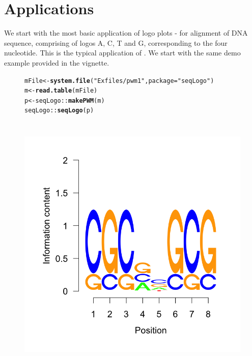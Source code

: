 \documentclass[12pt]{article}\usepackage[]{graphicx}\usepackage[usenames,dvipsnames]{color}
\makeatletter
\newcommand{\hlstr}[1]{\textcolor[rgb]{0.192,0.494,0.8}{#1}}%
\newcommand{\hlopt}[1]{\textcolor[rgb]{0,0,0}{#1}}%
\newcommand{\hlstd}[1]{\textcolor[rgb]{0.345,0.345,0.345}{#1}}%
\newcommand{\hlkwb}[1]{\textcolor[rgb]{0.69,0.353,0.396}{#1}}%
\newcommand{\hlkwc}[1]{\textcolor[rgb]{0.333,0.667,0.333}{#1}}%
\newcommand{\hlkwd}[1]{\textcolor[rgb]{0.737,0.353,0.396}{\textbf{#1}}}%
\newenvironment{kframe}{%
 \def\at@end@of@kframe{}%
 \ifinner\ifhmode%
  \def\at@end@of@kframe{\end{minipage}}%
  \begin{minipage}{\columnwidth}%
 \fi\fi%
 \def\FrameCommand##1{\hskip\@totalleftmargin \hskip-\fboxsep
 \colorbox{shadecolor}{##1}\hskip-\fboxsep
     \hskip-\linewidth \hskip-\@totalleftmargin \hskip\columnwidth}%
 \MakeFramed {\advance\hsize-\width
   \@totalleftmargin\z@ \linewidth\hsize
   \@setminipage}}%
 {\par\unskip\endMakeFramed%
 \at@end@of@kframe}
\newenvironment{knitrout}{}{} %
\makeatother
\begin{document}
\section{Applications}

We start with the most basic application of logo plots - for alignment of DNA sequence, comprising of logos A, C, T and G, corresponding to the four nucleotide. This is the typical application of . We start with the same demo example provided in the  vignette.

\begin{figure}[h]
\begin{center}
\begin{knitrout}
\color{fgcolor}\begin{kframe}
\begin{alltt}
\hlstd{mFile} \hlkwb{<-} \hlkwd{system.file}\hlstd{(}\hlstr{"Exfiles/pwm1"}\hlstd{,} \hlkwc{package}\hlstd{=}\hlstr{"seqLogo"}\hlstd{)}
\hlstd{m} \hlkwb{<-} \hlkwd{read.table}\hlstd{(mFile)}
\hlstd{p} \hlkwb{<-} \hlstd{seqLogo}\hlopt{::}\hlkwd{makePWM}\hlstd{(m)}
\hlstd{seqLogo}\hlopt{::}\hlkwd{seqLogo}\hlstd{(p)}
\end{alltt}
\end{kframe}
\includegraphics[width=5in,height=5in]{figure/seqlogo_use-1} 

\end{knitrout}
\end{center}
\end{figure}
\end{document}
